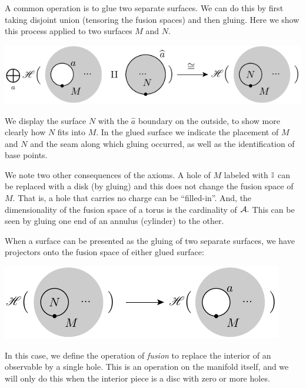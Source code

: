 \documentclass[aps, prl, letterpaper, twocolumn, superscriptaddress, notitlepage, 10pt]{revtex4-1}
\begin{document}
A common operation is to glue two separate surfaces.
We can do this by first taking disjoint union (tensoring
the fusion spaces)
and then gluing.
Here we show this process applied to two surfaces $M$ and $N$. 
\begin{center}
\includegraphics[]{pic-glue.pdf}
\end{center}
We display the surface $N$ with the $\widehat{a}$
boundary on the outside, 
to show more clearly how $N$ fits into $M$.
In the glued surface we
indicate the placement of $M$ and $N$ and the seam
along which gluing occurred,
as well as the identification of base points.

We note two other consequences of the axioms.
A hole of $M$ labeled with $\mathbb{I}$ can be replaced with a disk (by gluing)
and this does not change the fusion space of $M.$
That is, a hole that carries no charge can be ``filled-in''.
And, the dimensionality of the fusion space of a torus is the
cardinality of $\mathcal{A}.$
This can be seen by gluing one end
of an annulus (cylinder) to the other.

When a surface can be presented as the gluing of
two separate surfaces, we have projectors onto the
fusion space of either glued surface:
\begin{center}
\includegraphics[]{pic-fuse.pdf}
\end{center}
In this case, we define 
the operation of \emph{fusion} to replace the interior
of an observable by a single hole.
This is an operation on the manifold itself,
and we will only do this when the interior piece is a
disc with zero or more holes.

%
\end{document}
